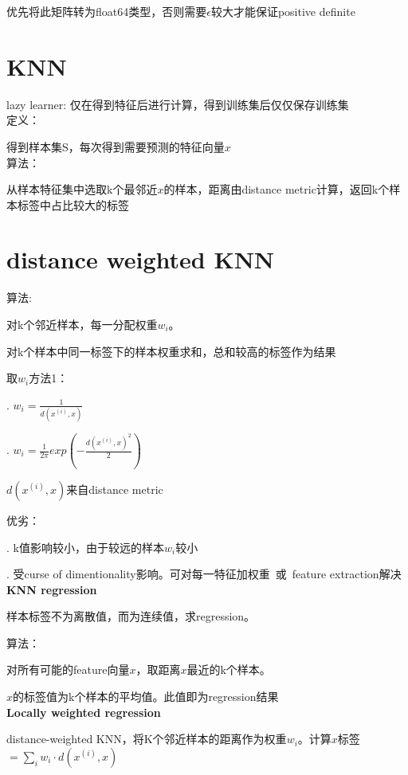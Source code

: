 \documentclass[UTF8]{ctexart}
\begin{document}
  \quad \quad \quad 优先将此矩阵转为float64类型，否则需要$\epsilon$较大才能保证positive definite
  
\section{KNN}
\noindent lazy learner: 仅在得到特征后进行计算，得到训练集后仅仅保存训练集\\
  定义：

  \quad 得到样本集S，每次得到需要预测的特征向量$x$\\
  算法：

  \quad 从样本特征集中选取k个最邻近$x$的样本，距离由distance metric计算，返回k个样本标签中占比较大的标签\\
\section{distance weighted KNN}

  算法:

  \quad 对k个邻近样本，每一分配权重$w_i$。

  \quad 对k个样本中同一标签下的样本权重求和，总和较高的标签作为结果

  取$w_i$方法1：

  . $w_i = \frac{1}{d(x^{(i)}, x)}$

  . $w_i = \frac{1}{2\pi} exp(-\frac{d(x^{(i)}, x)^2}{2})$

  \quad $d(x^{(i)}, x)$来自distance metric

  优劣：

  . k值影响较小，由于较远的样本$w_i$较小

  . 受curse of dimentionality影响。可对每一特征加权重\ 或\ feature extraction解决\\
\textbf{KNN regression}

  样本标签不为离散值，而为连续值，求regression。

  算法：

  \quad 对所有可能的feature向量$x$，取距离$x$最近的k个样本。
  
  \quad $x$的标签值为k个样本的平均值。此值即为regression结果\\
\textbf{Locally weighted regression}

  distance-weighted KNN，将K个邻近样本的距离作为权重$w_i$。计算$x$标签$ = \sum_i w_i \cdot d(x^{(i)}, x)$\\
\end{document}
